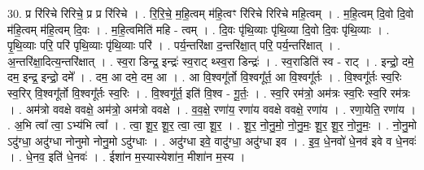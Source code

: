 \documentclass[17pt]{extarticle}
\begin{document}
30. प्र रि॑रिचे रिरिचे॒ प्र प्र रि॑रिचे । . रि॒रि॒चे॒ म॒हि॒त्वम् म॑हि॒त्वꣳ रि॑रिचे रिरिचे महि॒त्वम् । . म॒हि॒त्वम् दि॒वो दि॒वो म॑हि॒त्वम् म॑हि॒त्वम् दि॒वः । . म॒हि॒त्वमिति॑ महि - त्वम् । . दि॒वः पृ॑थि॒व्याः पृ॑थि॒व्या दि॒वो दि॒वः पृ॑थि॒व्याः । . पृ॒थि॒व्याः परि॒ परि॑ पृथि॒व्याः पृ॑थि॒व्याः परि॑ । . पर्य॒न्तरि॑क्षा द॒न्तरि॑क्षा॒त् परि॒ पर्य॒न्तरि॑क्षात् । . अ॒न्तरि॑क्षा॒दित्य॒न्तरि॑क्षात् । . स्व॒रा डिन्द्र॒ इन्द्रः॑ स्व॒राट् थ्स्व॒रा डिन्द्रः॑ । . स्व॒राडिति॑ स्व - राट् । . इन्द्रो॒ दमे॒ दम॒ इन्द्र॒ इन्द्रो॒ दमे᳚ । . दम॒ आ दमे॒ दम॒ आ । . आ वि॒श्वगू᳚र्तो वि॒श्वगू᳚र्त॒ आ वि॒श्वगू᳚र्तः । . वि॒श्वगू᳚र्तः स्व॒रिः स्व॒रिर् वि॒श्वगू᳚र्तो वि॒श्वगू᳚र्तः स्व॒रिः । . वि॒श्वगू᳚र्त॒ इति॑ वि॒श्व - गू॒र्तः॒ । . स्व॒रि रम॑त्रो॒ अम॑त्रः स्व॒रिः स्व॒रि रम॑त्रः । . अम॑त्रो ववक्षे ववक्षे॒ अम॑त्रो॒ अम॑त्रो ववक्षे । . व॒व॒क्षे॒ रणा॑य॒ रणा॑य ववक्षे ववक्षे॒ रणा॑य । . रणा॒येति॒ रणा॑य । . अ॒भि त्वा᳚ त्वा॒ ऽभ्य॑भि त्वा᳚ । . त्वा॒ शू॒र॒ शू॒र॒ त्वा॒ त्वा॒ शू॒र॒ । . शू॒र॒ नो॒नु॒मो॒ नो॒नु॒मः॒ शू॒र॒ शू॒र॒ नो॒नु॒मः॒ । . नो॒नु॒मो ऽदु॑ग्धा॒ अदु॑ग्धा नोनुमो नोनु॒मो ऽदु॑ग्धाः । . अदु॑ग्धा इवे॒ वादु॑ग्धा॒ अदु॑ग्धा इव । . इ॒व॒ धे॒नवो॑ धे॒नव॑ इवे व धे॒नवः॑ । . धे॒नव॒ इति॑ धे॒नवः॑ । . ईशा॑न म॒स्यास्येशा॑न॒ मीशा॑न म॒स्य । \newline
\end{document}
